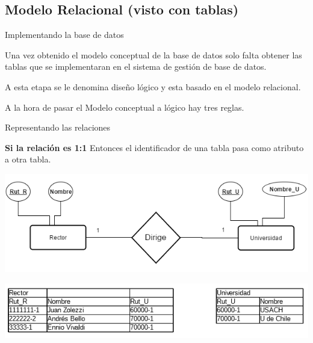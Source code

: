\documentclass[11pt]{beamer}
\begin{document}
\subsection{Modelo Relacional (visto con tablas)}

\begin{frame}{Implementando la base de datos}

Una vez obtenido el modelo conceptual de la base de datos solo falta obtener las tablas que se implementaran en el sistema de gestión de base de datos. 

A esta etapa se le denomina diseño lógico y esta basado en el modelo relacional.

A la hora de pasar el Modelo conceptual a lógico hay tres reglas.
\end{frame}


\begin{frame}{Representando las relaciones}



 \textbf{Si la relación es 1:1} Entonces el identificador de una tabla pasa como atributo a otra tabla.

\begin{center}
\includegraphics[scale=.5]{images/11mr.png} 
\end{center}
\begin{center}
\includegraphics[scale=0.7]{images/11mrt.png} 
\end{center}
\end{frame}
\end{document}

